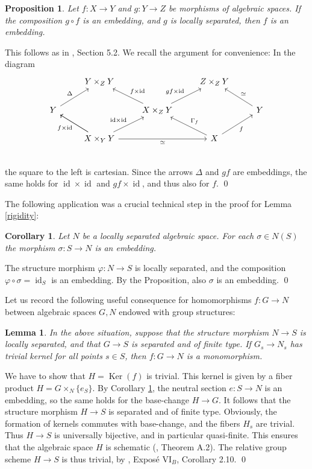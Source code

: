 \documentclass[oneside, 12pt]{amsart}
\newcommand\mylabel[1]{\label{#1}\marginpar{\raggedright\vspace{-1ex}\medskip\medskip\footnotesize \tt #1}}
\renewcommand\mylabel[1]{\label{#1}}
\newtheorem{lemma}[theorem]{Lemma}
\newtheorem{proposition}[theorem]{Proposition}
\newtheorem{corollary}[theorem]{Corollary}
\theoremstyle{definition}
\theoremstyle{remark}
\newcommand{\id}{{\operatorname{id}}}
\newcommand{\Kernel}{\operatorname{Ker}}
\newcommand{\ra}{\rightarrow}
\begin{document}
\begin{proposition}
\mylabel{embedding yoga}
Let $f:X\ra Y$ and $g:Y\ra Z$ be morphisms of algebraic spaces. If the composition $g\circ f$ is an embedding,
and $g$ is locally separated, then $f$ is an embedding.
\end{proposition}

\proof
This follows as in \cite{EGA I}, Section 5.2. We recall the argument for convenience:
In the diagram
$$
\begin{tikzcd} 
    & Y\times_ZY                                    &               & Z\times_ZY    & \\
Y\ar[ur,"\Delta"]  &                                               & X\times_ZY\ar[ul,"f\times\id"']\ar[ur,"gf\times\id"]    &               &  Y\ar[ul,"\simeq"']   \\
    & X\times_YY\ar[rr,"\simeq"']\ar[ul]\ar[ur,"\id\times\id"]\ar[ul,"f\times\id"]       &               & X\ar[ur,"f"']\ar[ul,"\Gamma_f"']\\   
\end{tikzcd}
$$
the square to the left is cartesian. Since the arrows $\Delta$ and $gf$ are embeddings, the same holds for 
$\id\times \id$ and $gf\times\id$, and thus also for $f$.
\qed

\medskip
The following application  was a crucial technical step in the proof for Lemma \ref{rigidity}:

\begin{corollary}
\mylabel{section embedding}
Let   $N$ be a locally separated algebraic space. For each $\sigma\in N(S)$
the morphism $\sigma:S\ra N$ is an embedding.
\end{corollary}

\proof
The structure morphism  $\varphi:N\ra S$ is locally separated, and the composition
$\varphi\circ\sigma=\id_S$ is an embedding. By the Proposition, also $\sigma$ is an embedding.
\qed

\medskip
Let us record the following useful consequence for homomorphisms $f:G\ra N$ between algebraic spaces $G,N$ 
endowed with    group structures:

\begin{lemma}
\mylabel{kernel trivial}
In the above situation, suppose that  the structure morphism $N\ra S$ is locally separated, and that $G\ra S$ is separated and of finite type.
If  $ G_s\ra N_s$ has trivial kernel for all points $s\in S$, then $f:G\ra N$ is a monomorphism.
\end{lemma}

\proof
We have to show that  $H=\Kernel(f)$ is trivial. This kernel is given by a fiber product $H=G\times_N\{e_S\}$.
By Corollary \ref{section embedding}, the neutral section $e:S\ra N$ is an embedding, so the same holds for the base-change $H\ra G$.
It follows that the structure morphism $H\ra S$ is separated and of finite type.
Obviously, the formation of kernels commutes with base-change, and the fibers $H_s$ are trivial. Thus $H\ra S$ is universally bijective,
and in particular quasi-finite. This ensures that the algebraic space  $H$ is schematic (\cite{Laumon; Moret-Bailly 2000}, Theorem A.2).
The relative group scheme $H\ra S$ is thus trivial, by \cite{SGA 3b}, Expos\'e VI$_B$,  Corollary 2.10.
\qed
\end{document}
